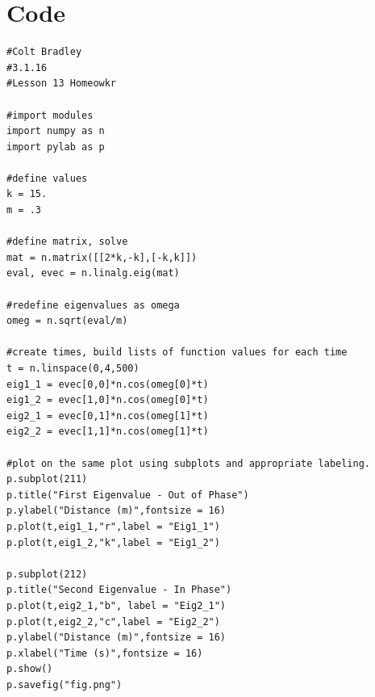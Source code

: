 \documentclass[11pt]{article}
\begin{document}
\section{Code}

\begin{verbatim}
#Colt Bradley
#3.1.16
#Lesson 13 Homeowkr

#import modules
import numpy as n
import pylab as p

#define values
k = 15.
m = .3

#define matrix, solve
mat = n.matrix([[2*k,-k],[-k,k]])
eval, evec = n.linalg.eig(mat)

#redefine eigenvalues as omega
omeg = n.sqrt(eval/m)

#create times, build lists of function values for each time
t = n.linspace(0,4,500)
eig1_1 = evec[0,0]*n.cos(omeg[0]*t)
eig1_2 = evec[1,0]*n.cos(omeg[0]*t)
eig2_1 = evec[0,1]*n.cos(omeg[1]*t) 
eig2_2 = evec[1,1]*n.cos(omeg[1]*t)

#plot on the same plot using subplots and appropriate labeling. 
p.subplot(211)
p.title("First Eigenvalue - Out of Phase")
p.ylabel("Distance (m)",fontsize = 16)
p.plot(t,eig1_1,"r",label = "Eig1_1")
p.plot(t,eig1_2,"k",label = "Eig1_2")

p.subplot(212)
p.title("Second Eigenvalue - In Phase")
p.plot(t,eig2_1,"b", label = "Eig2_1")
p.plot(t,eig2_2,"c",label = "Eig2_2")
p.ylabel("Distance (m)",fontsize = 16)
p.xlabel("Time (s)",fontsize = 16)
p.show()
p.savefig("fig.png")
\end{verbatim}
\end{document}
